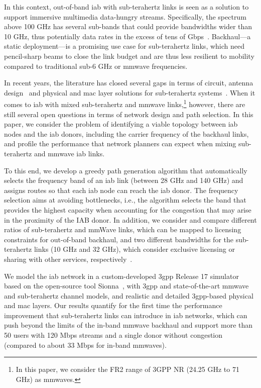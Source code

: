 In this context, out-of-band \gls{iab} with sub-terahertz links is seen as a solution
%
to support immersive multimedia data-hungry streams. 
%
Specifically, the spectrum above 100 GHz has several sub-bands that could provide bandwidths wider than 10 GHz, thus potentially data rates in the excess of tens of Gbps~\cite{akyildiz2014terahertz}. Backhaul---a static deployment---is a promising use case for sub-terahertz links, which need pencil-sharp beams to close the link budget and are thus less resilient to mobility compared to traditional sub-6 GHz or \gls{mmwave} frequencies. 

In recent years, the literature has closed several gaps in terms of circuit, antenna design~\cite{singh2020design} and physical and \gls{mac} layer solutions for sub-terahertz systems~\cite{ghafoor2020mac}.
%
When it comes to \gls{iab} with mixed sub-terahertz and \gls{mmwave} links,\footnote{In this paper, we consider the FR2 range of 3GPP NR (24.25 GHz to 71 GHz) as \glspl{mmwave}.} however, there are still several open questions in terms of network design and path selection. In this paper, we consider the problem of identifying a viable topology between \gls{iab} nodes and the \gls{iab} donors, including the carrier frequency of the backhaul links, and profile the performance that network planners can expect when mixing sub-terahertz and \gls{mmwave} \gls{iab} links.

To this end, 
%
we develop a greedy path generation algorithm that automatically selects the frequency band of an \gls{iab} link (between 28 GHz and 140 GHz) and assigns routes so that each \gls{iab} node can reach the \gls{iab} donor. The frequency selection aims at avoiding bottlenecks, i.e., the algorithm selects the band that provides the highest capacity when accounting for the congestion that may arise in the proximity of the IAB donor. In addition, we consider and compare different ratios of sub-terahertz and mmWave links, which can be mapped to licensing constraints for out-of-band backhaul, and two different bandwidths for the sub-terahertz links (10 GHz and 32 GHz), which consider exclusive licensing or sharing with other services, respectively~\cite{polese2022dynamic}.

We model the \gls{iab} network in a custom-developed \gls{3gpp} Release 17 simulator based on the open-source tool Sionna~\cite{hoydis2022sionna}, with \gls{3gpp} and state-of-the-art \gls{mmwave} and sub-terahertz channel models, and realistic and detailed \gls{3gpp}-based physical and \gls{mac} layers. Our results quantify for the first time the performance improvement that sub-terahertz links can introduce in \gls{iab} networks, which can push beyond the limits of the in-band \gls{mmwave} backhaul and support more than 50 users with 120 Mbps streams and a single donor without congestion (compared to about 33 Mbps for in-band \glspl{mmwave}). 

